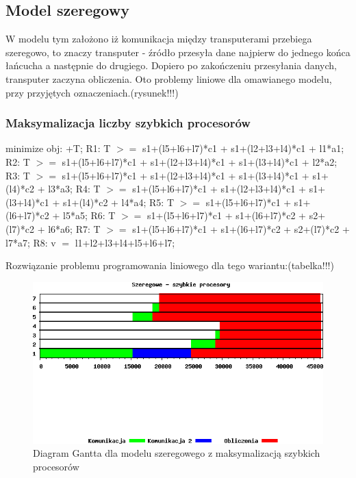 \documentclass[a4paper,11pt, titlepage]{article}
\begin{document}
\subsection{Model szeregowy}
W modelu tym założono iż komunikacja między transputerami przebiega szeregowo,  to znaczy transputer - źródło przesyła dane najpierw do jednego końca łańcucha a następnie do drugiego. Dopiero po zakończeniu przesyłania danych, transputer zaczyna obliczenia. Oto problemy liniowe dla omawianego modelu, przy przyjętych oznaczeniach.(rysunek!!!)

\subsubsection{Maksymalizacja liczby szybkich procesorów}
\begin{flushleft}

minimize obj: +T;\linebreak
\linebreak
R1: T $>=$ s1+(l5+l6+l7)*c1 + s1+(l2+l3+l4)*c1 + l1*a1;\linebreak
R2: T $>=$ s1+(l5+l6+l7)*c1 + s1+(l2+l3+l4)*c1 + s1+(l3+l4)*c1 + l2*a2;\linebreak
R3: T $>=$ s1+(l5+l6+l7)*c1 + s1+(l2+l3+l4)*c1 + s1+(l3+l4)*c1 + s1+(l4)*c2 + l3*a3;\linebreak
R4: T $>=$ s1+(l5+l6+l7)*c1 + s1+(l2+l3+l4)*c1 + s1+(l3+l4)*c1 + s1+(l4)*c2 + l4*a4;\linebreak
R5: T $>=$ s1+(l5+l6+l7)*c1 + s1+(l6+l7)*c2 + l5*a5;\linebreak
R6: T $>=$ s1+(l5+l6+l7)*c1 + s1+(l6+l7)*c2 + s2+(l7)*c2 + l6*a6;\linebreak
R7: T $>=$ s1+(l5+l6+l7)*c1 + s1+(l6+l7)*c2 + s2+(l7)*c2 + l7*a7;\linebreak
R8: v $=$ l1+l2+l3+l4+l5+l6+l7;\linebreak
\end{flushleft}

Rozwiązanie problemu programowania liniowego dla tego wariantu:(tabelka!!!)
\begin{figure}[htp!]
\includegraphics[width=1.0\textwidth]{wykresy/szeregowe_proc}
\caption{Diagram Gantta dla modelu szeregowego z maksymalizacją szybkich procesorów \label{szeregowe_p}}
\end{figure}
\end{document}
